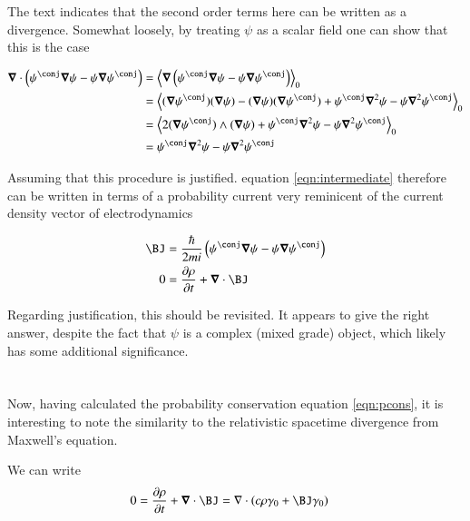 \documentclass{article}
\begin{document}
The text indicates that the second order terms here can be written as a divergence.  Somewhat loosely, by treating $\psi$ as a scalar field one can show that this is the case

\begin{align*}
\spacegrad \cdot \left( \psi^\conj \spacegrad \psi - \psi \spacegrad \psi^\conj \right) 
&=
\gpgradezero{
\spacegrad \left( \psi^\conj \spacegrad \psi - \psi \spacegrad \psi^\conj \right) 
} \\
&=
\gpgradezero{
(\spacegrad \psi^\conj) (\spacegrad \psi) - (\spacegrad \psi) (\spacegrad \psi^\conj)
+\psi^\conj \spacegrad^2 \psi - \psi \spacegrad^2 \psi^\conj
} \\
&=
\gpgradezero{
2 (\spacegrad \psi^\conj) \wedge (\spacegrad \psi) 
+\psi^\conj \spacegrad^2 \psi - \psi \spacegrad^2 \psi^\conj
} \\
&=
\psi^\conj \spacegrad^2 \psi - \psi \spacegrad^2 \psi^\conj
 \\
\end{align*}

Assuming that this procedure is justified.
equation \ref{eqn:intermediate} therefore can be written
in terms of a probability current very reminicent of the current density vector of electrodynamics

\begin{align}\label{eqn:pcons}
\BJ &= \frac{\hbar}{2mi} \left( \psi^\conj \spacegrad \psi - \psi \spacegrad \psi^\conj \right) \\
0 &= \PD{t}{\rho} + \spacegrad \cdot \BJ 
\end{align}

Regarding justification, this should be revisited.
It appears to give the right answer, despite the fact that $\psi$ is a complex (mixed grade) object, which
likely has some additional significance.

\section{}

Now, having calculated the probability conservation equation \ref{eqn:pcons}, it is interesting to
note the similarity to the relativistic spacetime divergence from Maxwell's equation.

We can write
\begin{align*}
0 = \PD{t}{\rho} + \spacegrad \cdot \BJ &= \grad \cdot \left( c\rho \gamma_0 + \BJ \gamma_0 \right)
\end{align*}
\end{document}
